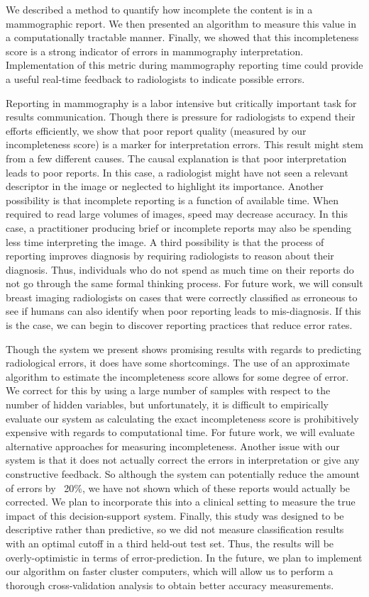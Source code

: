 We described a method to quantify how incomplete the content is in a mammographic report. We then presented an algorithm to measure this value in a computationally tractable manner. Finally, we showed that this incompleteness score is a strong indicator of errors in mammography interpretation. Implementation of this metric during mammography reporting time could provide a useful real-time feedback to radiologists to indicate possible errors.

Reporting in mammography is a labor intensive but critically important task for results communication. Though there is pressure for radiologists to expend their efforts efficiently, we show that poor report quality (measured by our incompleteness score) is a marker for interpretation errors. This result might stem from a few different causes. The causal explanation is that poor interpretation leads to poor reports. In this case, a radiologist might have not seen a relevant descriptor in the image or neglected to highlight its importance. Another possibility is that incomplete reporting is a function of available time. When required to read large volumes of images, speed may decrease accuracy. In this case, a practitioner producing brief or incomplete reports may also be spending less time interpreting the image. A third possibility is that the process of reporting improves diagnosis by requiring radiologists to reason about their diagnosis. Thus, individuals who do not spend as much time on their reports do not go through the same formal thinking process. For future work, we will consult breast imaging radiologists on cases that were correctly classified as erroneous to see if humans can also identify when poor reporting leads to mis-diagnosis. If this is the case, we can begin to discover reporting practices that reduce error rates.

Though the system we present shows promising results with regards to predicting radiological errors, it does have some shortcomings. The use of an approximate algorithm to estimate the incompleteness score allows for some degree of error. We correct for this by using a large number of samples with respect to the number of hidden variables, but unfortunately, it is difficult to empirically evaluate our system as calculating the exact incompleteness score is prohibitively expensive with regards to computational time. For future work, we will evaluate alternative approaches for measuring incompleteness. Another issue with our system is that it does not actually correct the errors in interpretation or give any constructive feedback. So although the system can potentially reduce the amount of errors by  ~20\%, we have not shown which of these reports would actually be corrected. We plan to incorporate this into a clinical setting to measure the true impact of this decision-support system. Finally, this study was designed to be descriptive rather than predictive, so we did not measure classification results with an optimal cutoff in a third held-out test set. Thus, the results will be overly-optimistic in terms of error-prediction. In the future, we plan to implement our algorithm on faster cluster computers, which will allow us to perform a thorough cross-validation analysis to obtain better accuracy measurements. 

